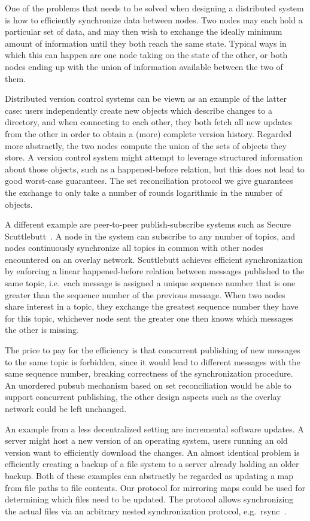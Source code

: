 
One of the problems that needs to be solved when designing a distributed system is how to efficiently synchronize data between nodes.
Two nodes may each hold a particular set of data, and may then wish to exchange the ideally minimum amount of information until they both reach the same state.
Typical ways in which this can happen are one node taking on the state of the other, or both nodes ending up with the union of information available between the two of them.

Distributed version control systems can be viewn as an example of the latter case: users independently create new objects which describe changes to a directory, and when connecting to each other, they both fetch all new updates from the other in order to obtain a (more) complete version history.
Regarded more abstractly, the two nodes compute the union of the sets of objects they store.
A version control system might attempt to leverage structured information about those objects, such as a happened-before relation, but this does not lead to good worst-case guarantees.
The set reconciliation protocol we give guarantees the exchange to only take a number of rounds logarithmic in the number of objects.

A different example are peer-to-peer publish-subscribe systems such as
Secure Scuttlebutt~\cite{tarr2019secure}. A node in the system can subscribe to
any number of topics, and nodes continuously synchronize all topics in
common with other nodes encountered on an overlay network. Scuttlebutt achieves
efficient synchronization by enforcing a linear happened-before
relation between messages published to the same topic, i.e.~each message
is assigned a unique sequence number that is one greater than the
sequence number of the previous message. When two nodes share interest
in a topic, they exchange the greatest sequence number they have for
this topic, whichever node sent the greater one then knows which
messages the other is missing.

The price to pay for the efficiency is that concurrent publishing of new
messages to the same topic is forbidden, since it would lead to
different messages with the same sequence number, breaking correctness
of the synchronization procedure. An unordered pubsub mechanism based on
set reconciliation would be able to support concurrent publishing, the
other design aspects such as the overlay network could be left
unchanged.

An example from a less decentralized setting are incremental software
updates. A server might host a new version of an operating system, users
running an old version want to efficiently download the changes. An
almost identical problem is efficiently creating a backup of a file
system to a server already holding an older backup. Both of these
examples can abstractly be regarded as updating a map from file paths to
file contents. Our protocol for mirroring maps could be used for
determining which files need to be updated. The protocol allows
synchronizing the actual files via an arbitrary nested synchronization
protocol, e.g.~rsync~\cite{tridgell1996rsync}.

